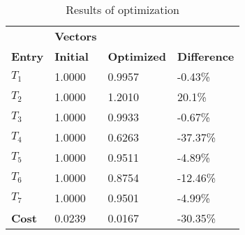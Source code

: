 \begin{table}[H]
\centering
\begin{tabular}{llll}
\textbf{}      & \cellcolor[HTML]{EFEFEF}\textbf{Vectors} & \textbf{} & \textbf{}         \\
\rowcolor[HTML]{EFEFEF} 
\textbf{Entry} & \textbf{Initial} & \textbf{Optimized} & \textbf{Difference} \\
$T_1$ & 1.0000 & 0.9957 & -0.43\% \\ 
$T_2$ & 1.0000 & 1.2010 & 20.1\% \\ 
$T_3$ & 1.0000 & 0.9933 & -0.67\% \\ 
$T_4$ & 1.0000 & 0.6263 & -37.37\% \\ 
$T_5$ & 1.0000 & 0.9511 & -4.89\% \\ 
$T_6$ & 1.0000 & 0.8754 & -12.46\% \\ 
$T_7$ & 1.0000 & 0.9501 & -4.99\% \\ 
\rowcolor[HTML]{EFEFEF} 
\textbf{Cost}  & 0.0239 & 0.0167 & -30.35\% \\ 
\end{tabular}
\caption{Results of optimization}
\label{tab:OptimizationAnalysis}
\end{table}